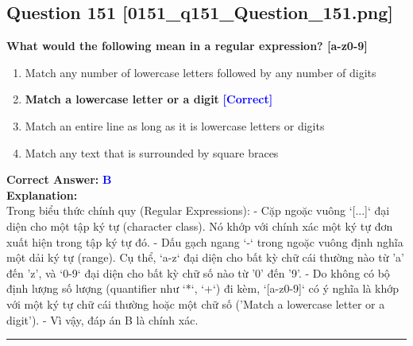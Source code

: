 \documentclass[11pt,a4paper]{article}
\begin{document}
\begin{minipage}{\textwidth}
\subsection*{Question 151 \quad \footnotesize{[0151_q151_Question_151.png]}}
\noindent \textbf{What would the following mean in a regular expression? [a-z0-9]}

\begin{enumerate}[label=\Alph*.]
    \item Match any number of lowercase letters followed by any number of digits
    \item \textbf{Match a lowercase letter or a digit} \hfill \textcolor{blue}{\textbf{[Correct]}}
    \item Match an entire line as long as it is lowercase letters or digits
    \item Match any text that is surrounded by square braces
\end{enumerate}

\noindent \textbf{Correct Answer:} \textcolor{blue}{\textbf{B}} \\[4pt]
\noindent \textbf{Explanation:}\\
Trong biểu thức chính quy (Regular Expressions):\newline
- Cặp ngoặc vuông `[...]` đại diện cho một tập ký tự (character class). Nó khớp với chính xác một ký tự đơn xuất hiện trong tập ký tự đó.\newline
- Dấu gạch ngang `-` trong ngoặc vuông định nghĩa một dải ký tự (range). Cụ thể, `a-z` đại diện cho bất kỳ chữ cái thường nào từ 'a' đến 'z', và `0-9` đại diện cho bất kỳ chữ số nào từ '0' đến '9'.\newline
- Do không có bộ định lượng số lượng (quantifier như `*`, `+`) đi kèm, `[a-z0-9]` có ý nghĩa là khớp với một ký tự chữ cái thường hoặc một chữ số ('Match a lowercase letter or a digit').\newline
- Vì vậy, đáp án B là chính xác.
\end{minipage}
\vspace{0.8cm}
\hrule
\vspace{0.5cm}
\end{document}
